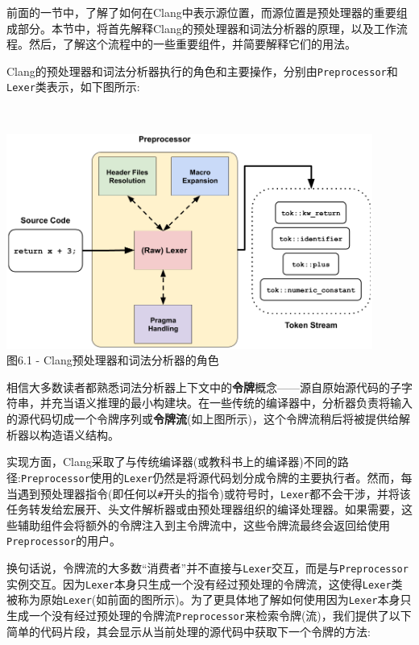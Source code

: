 
前面的一节中，了解了如何在Clang中表示源位置，而源位置是预处理器的重要组成部分。本节中，将首先解释Clang的预处理器和词法分析器的原理，以及工作流程。然后，了解这个流程中的一些重要组件，并简要解释它们的用法。


Clang的预处理器和词法分析器执行的角色和主要操作，分别由\texttt{Preprocessor}和\texttt{Lexer}类表示，如下图所示:

\hspace*{\fill} \\ %
\begin{center}
\includegraphics[width=0.9\textwidth]{content/2/chapter6/images/1.png}\\
图6.1 - Clang预处理器和词法分析器的角色
\end{center}

相信大多数读者都熟悉词法分析器上下文中的\textbf{令牌}概念——源自原始源代码的子字符串，并充当语义推理的最小构建块。在一些传统的编译器中，分析器负责将输入的源代码切成一个令牌序列或\textbf{令牌流}(如上图所示)，这个令牌流稍后将被提供给解析器以构造语义结构。

实现方面，Clang采取了与传统编译器(或教科书上的编译器)不同的路径:\texttt{Preprocessor}使用的\texttt{Lexer}仍然是将源代码划分成令牌的主要执行者。然而，每当遇到预处理器指令(即任何以\texttt{\#}开头的指令)或符号时，\texttt{Lexer}都不会干涉，并将该任务转发给宏展开、头文件解析器或由预处理器组织的编译处理器。如果需要，这些辅助组件会将额外的令牌注入到主令牌流中，这些令牌流最终会返回给使用\texttt{Preprocessor}的用户。

换句话说，令牌流的大多数“消费者”并不直接与\texttt{Lexer}交互，而是与\texttt{Preprocessor}实例交互。因为\texttt{Lexer}本身只生成一个没有经过预处理的令牌流，这使得\texttt{Lexer}类被称为原始\texttt{Lexer}(如前面的图所示)。为了更具体地了解如何使用因为\texttt{Lexer}本身只生成一个没有经过预处理的令牌流\texttt{Preprocessor}来检索令牌(流)，我们提供了以下简单的代码片段，其会显示从当前处理的源代码中获取下一个令牌的方法:

